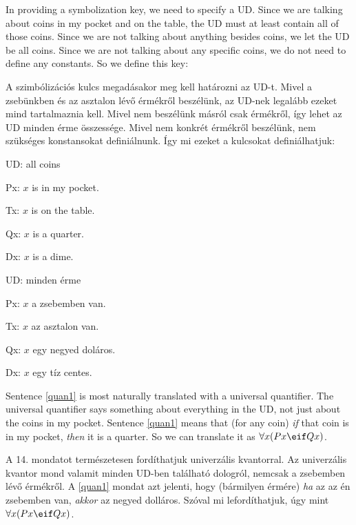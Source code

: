 In providing a symbolization key, we need to specify a UD. Since we are talking about coins in my pocket and on the table, the UD must at least contain all of those coins. Since we are not talking about anything besides coins, we let the UD be all coins. Since we are not talking about any specific coins, we do not need to define any constants. So we define this key:

A szimbólizációs kulcs megadásakor meg kell határozni az UD-t. Mivel a zsebünkben és az asztalon lévő érmékről beszélünk, az UD-nek legalább ezeket mind tartalmaznia kell. Mivel nem beszélünk másról csak érmékről, így lehet az UD minden érme összessége. Mivel nem konkrét érmékről beszélünk, nem szükséges konstansokat definiálnunk. Így mi ezeket a kulcsokat definiálhatjuk:

\begin{ekey}
\item[UD:] all coins
\item[Px:] $x$ is in my pocket.
\item[Tx:] $x$ is on the table.
\item[Qx:] $x$ is a quarter.
\item[Dx:] $x$ is a dime.
\end{ekey}

\begin{ekey}
\item[UD:] minden érme
\item[Px:] $x$ a zsebemben van.
\item[Tx:] $x$ az asztalon van.
\item[Qx:] $x$ egy negyed doláros.
\item[Dx:] $x$ egy tíz centes.
\end{ekey}

Sentence \ref{quan1} is most naturally translated with a universal quantifier. The universal quantifier says something about everything in the UD, not just about the coins in my pocket. Sentence \ref{quan1} means that (for any coin) \emph{if} that coin is in my pocket, \emph{then} it is a quarter. So we can translate it as $\forall x(Px \eif Qx)$.

A 14. mondatot természetesen fordíthatjuk univerzális kvantorral. Az univerzális kvantor mond valamit minden UD-ben található dologról, nemcsak a zsebemben lévő érmékről.
A \ref{quan1} mondat azt jelenti, hogy (bármilyen érmére) \emph{ha} az az én zsebemben van, \emph{akkor} az negyed dolláros. Szóval mi lefordíthatjuk, úgy mint $\forall x(Px \eif Qx)$.

	

